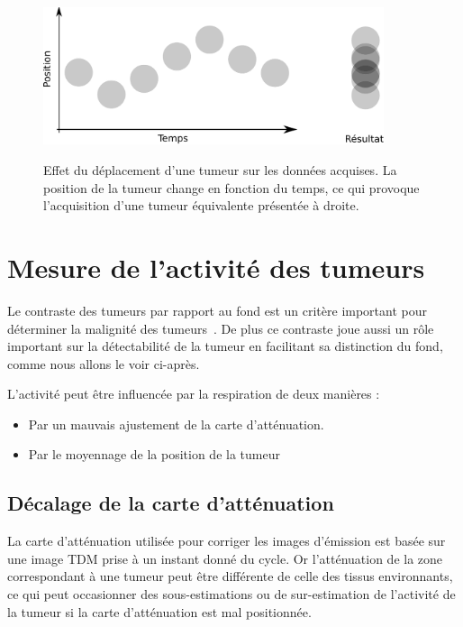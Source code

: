 \begin{figure}[h!]
    \begin{center}
            \includegraphics[width=10cm]{images/moyennageImage} \\
    \end{center}
    \caption[Effet du déplacement d'une tumeur sur les données acquises]{Effet du déplacement d'une tumeur sur les données acquises. La position de la tumeur change en fonction du temps, ce qui provoque l'acquisition d'une tumeur équivalente présentée à droite.}
    \label{fig:effetMvt}
\end{figure}


\section{Mesure de l'activité des tumeurs}

Le contraste des tumeurs par rapport au fond est un critère important pour déterminer la malignité des tumeurs~\cite{dimitrakopoulou2002role, krak2005effects}. De plus ce contraste joue aussi un rôle important sur la détectabilité de la tumeur en facilitant sa distinction du fond, comme nous allons le voir ci-après.

L'activité peut être influencée par la respiration de deux manières : 
\begin{itemize}
 \item Par un mauvais ajustement de la carte d'atténuation.
 \item Par le moyennage de la position de la tumeur
\end{itemize}


\subsection{Décalage de la carte d'atténuation}

La carte d'atténuation utilisée pour corriger les images d'émission est basée sur une image TDM prise à un instant donné du cycle. Or l'atténuation de la zone correspondant à une tumeur peut être différente de celle des tissus environnants, ce qui peut occasionner des sous-estimations ou de sur-estimation de l'activité de la tumeur si la carte d'atténuation est mal positionnée.

